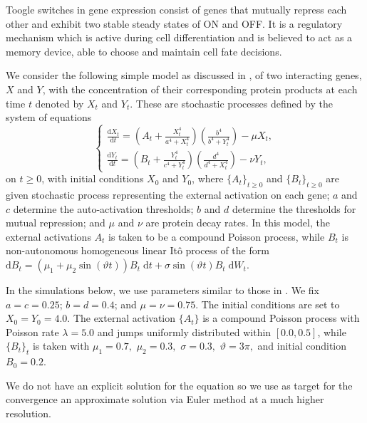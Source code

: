 \documentclass[reqno,12pt]{amsart}
\theoremstyle{plain} %
\theoremstyle{definition} %
\begin{document}
Toogle switches in gene expression consist of genes that mutually repress each other and exhibit two stable steady states of ON and OFF. It is a regulatory mechanism which is active during cell differentiation and is believed to act as a memory device, able to choose and maintain cell fate decisions.

We consider the following simple model as discussed in \cite[Section 7.8]{Asai2016}, of two interacting genes, $X$ and $Y$, with the concentration of their corresponding protein products at each time $t$ denoted by $X_t$ and $Y_t$. These are stochastic processes defined by the system of equations
\begin{equation}
    \label{toggleswitchsystem}
   \begin{cases}
   \frac{\displaystyle \mathrm{d}X_t}{\displaystyle \mathrm{d} t} = \left( A_t + \frac{\displaystyle X_t^4}{\displaystyle a^4 + X_t^4}\right)\left(\frac{\displaystyle b^4}{\displaystyle b^4 + Y_t^4}\right) - \mu X_t, \\
   \frac{\displaystyle \mathrm{d}Y_t}{\displaystyle \mathrm{d} t} = \left( B_t + \frac{\displaystyle Y_t^4}{\displaystyle c^4 + Y_t^4}\right)\left(\frac{\displaystyle d^4}{\displaystyle d^4 + X_t^4}\right) - \nu Y_t,
   \end{cases}
\end{equation}
on $t \geq 0$, with initial conditions $X_0$ and $Y_0$, where $\{A_t\}_{t\geq 0}$ and $\{B_t\}_{t\geq 0}$ are given stochastic process representing the external activation on each gene; $a$ and $c$ determine the auto-activation thresholds; $b$ and $d$ determine the thresholds for mutual repression; and $\mu$ and $\nu$ are protein decay rates. In this model, the external activations $A_t$ is taken to be a compound Poisson process, while $B_t$ is non-autonomous homogeneous linear It\^o process of the form $\mathrm{d}B_t = (\mu_1 + \mu_2\sin(\vartheta t))B_t\;\mathrm{d}t + \sigma\sin(\vartheta t)B_t\;\mathrm{d}W_t$.

In the simulations below, we use parameters similar to those in \cite[Section 7.8]{Asai2016}. We fix $a = c = 0.25$; $b = d = 0.4$; and $\mu = \nu = 0.75$. The initial conditions are set to $X_0 = Y_0 = 4.0$. The external activation $\{A_t\}$ is a compound Poisson process with Poisson rate $\lambda = 5.0$ and jumps uniformly distributed within $[0.0, 0.5]$, while $\{B_t\}_t$ is taken with $\mu_1 = 0.7,$ $\mu_2 = 0.3,$ $\sigma = 0.3,$ $\vartheta=3\pi,$ and initial condition $B_0 = 0.2.$

We do not have an explicit solution for the equation so we use as target for the convergence an approximate solution via Euler method at a much higher resolution.
\end{document}

